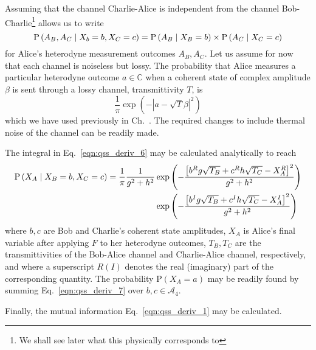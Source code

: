 Assuming that the channel Charlie-Alice is independent from the channel Bob-Charlie\footnote{We shall see later what this physically corresponds to} allows us to write
\begin{equation}\label{eqn:qss_deriv_6}
\text{P}\left(A_B, A_C \; \middle| \; X_b=b, X_C=c\right) = \text{P}\left(A_B \; \middle| \; X_B=b\right) \times \text{P}\left(A_C \; \middle| \; X_C=c\right)
\end{equation}
for Alice's heterodyne measurement outcomes $A_B, A_C$. Let us assume for now that each channel is noiseless but lossy. The probability that Alice measures a particular heterodyne outcome $a \in \mathbb{C}$ when a coherent state of complex amplitude $\beta$ is sent through a lossy channel, transmittivity $T$, is 
\begin{equation}\label{eqn:qss_channel_classical_prob}
\frac{1}{\pi}\exp\left( - \left| a - \sqrt{T}\beta \right|^2\right)
\end{equation}
which we have used previously in Ch.~. The required changes to include thermal noise of the channel can be readily made.

The integral in Eq.~\ref{eqn:qss_deriv_6} may be calculated analytically to reach 
\begin{align}\label{eqn:qss_deriv_7}
\text{P}\left(X_A \given X_B=b, X_C=c\right) = \frac{1}{\pi} \frac{1}{g^2 + h^2} &\exp \left( - \frac{\left[b^R g \sqrt{T_B} + c^R h \sqrt{T_C} - X_A^R \right]^2}{g^2 + h^2}\right) \notag \\
%
&\exp \left( - \frac{\left[b^I g \sqrt{T_B} + c^I h \sqrt{T_C} - X_A^I \right]^2}{g^2 + h^2} \right)
\end{align}
where $b, c$ are Bob and Charlie's coherent state amplitudes, $X_A$ is Alice's final variable after applying $F$ to her heterodyne outcomes, $T_B, T_C$ are the transmittivities of the Bob-Alice channel and Charlie-Alice channel, respectively, and where a superscript $R\left(I\right)$ denotes the real (imaginary) part of the corresponding quantity.  The probability $\text{P}\left(X_A=a\right)$ may be readily found by summing Eq.~\ref{eqn:qss_deriv_7} over $b, c \in \mathcal{A}_4$. 

Finally, the mutual information Eq.~\ref{eqn:qss_deriv_1} may be calculated. 

